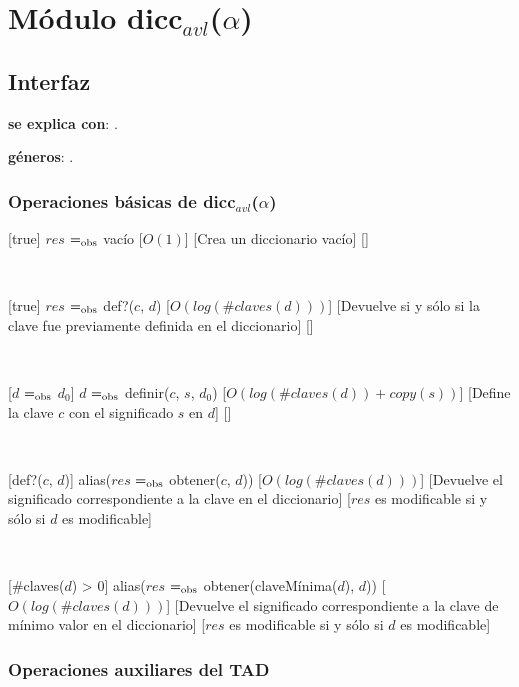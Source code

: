 \section{Módulo dicc$_{avl}$($\alpha$)}

\subsection{Interfaz}

\textbf{se explica con}: .

\textbf{géneros}: .

\subsubsection{Operaciones básicas de dicc$_{avl}$($\alpha$)}

	[true]
	{$res$ $=_{\mathrm{obs}}$ vacío}%
	[$O(1)$]
	[Crea un diccionario vacío]
	[]

	~

	[true]
	{$res$ $=_{\mathrm{obs}}$ def?($c$, $d$)}
	[$O(log(\#claves(d)))$]
	[Devuelve  si y sólo si la clave fue previamente definida en el diccionario]
	[]

	~

	[$d$ $=_{\mathrm{obs}}$ $d_0$]
	{$d$ $=_{\mathrm{obs}}$ definir($c$, $s$, $d_0$)}
	[$O(log(\#claves(d)) + copy(s))$]
	[Define la clave $c$ con el significado $s$ en $d$]
	[]

	~

	[def?($c$, $d$)]
	{alias($res$ $=_{\mathrm{obs}}$ obtener($c$, $d$))}
	[$O(log(\#claves(d)))$]
	[Devuelve el significado correspondiente a la clave en el diccionario]
	[$res$ es modificable si y sólo si $d$ es modificable]

	~

	[\#claves($d$) > 0]
	{alias($res$ $=_{\mathrm{obs}}$ obtener(claveMínima($d$), $d$))}
	[$O(log(\#claves(d)))$]
	[Devuelve el significado correspondiente a la clave de mínimo valor en el diccionario]
	[$res$ es modificable si y sólo si $d$ es modificable]

\subsubsection{Operaciones auxiliares del TAD}

